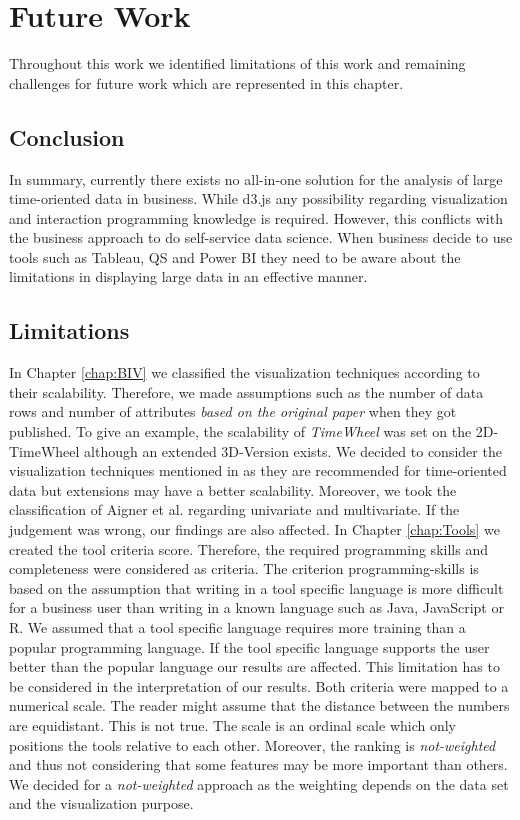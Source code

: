\chapter{Future Work}
\label{Future Work}
Throughout this work we identified limitations of this work and remaining challenges for future work which are represented in this chapter. 
\section{Conclusion}\label{conclusion}
In summary, currently there exists no all-in-one solution for the analysis of large time-oriented data in business. While d3.js any possibility regarding visualization and  interaction programming knowledge is required. However, this conflicts with the business approach to do self-service data science. When business decide to use tools such as Tableau, QS and Power BI they need to be aware about the limitations in displaying large data in an effective manner. 


\section{Limitations} \label{limitations}
In Chapter \ref{chap:BIV} we classified the visualization techniques according to their scalability. Therefore, we made assumptions such as the number of data rows and number of attributes \textit{based on the original paper} when they got published. To give an example, the scalability of \textit{TimeWheel} was set on the 2D-TimeWheel although an extended 3D-Version exists. We decided to consider the visualization techniques mentioned in \cite{Aigner2011} as they are recommended for time-oriented data but extensions may have a better scalability.  
Moreover, we took the classification of Aigner et al. \cite{Aigner2011} regarding univariate and multivariate. If the judgement was wrong, our findings are also affected.
In Chapter \ref{chap:Tools} we created the tool criteria score. Therefore, the required programming skills and completeness were considered as criteria. The criterion programming-skills is based on the assumption that writing in a tool specific language is more difficult for a business user than writing in a known language such as Java, JavaScript or R. We assumed that a tool specific language requires more training than a popular programming language. If the tool specific language supports the user better than the popular language our results are affected. This limitation has to be considered in the interpretation of our results. Both criteria were mapped to a numerical scale. The reader might assume that the distance between the numbers are equidistant. This is not true. The scale is an ordinal scale which only positions the tools relative to each other. Moreover, the ranking is \textit{not-weighted} and thus not considering that some features may be more important than others. We decided for a \textit{not-weighted} approach as the weighting depends on the data set and the visualization purpose. 


